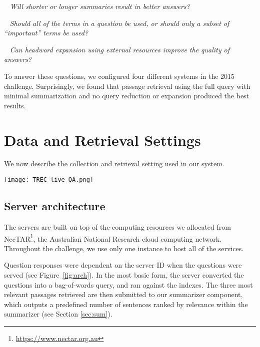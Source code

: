 \documentclass[a4paper,10pt,conference,compsocconf,final]{IEEEtran}
\newcommand{\myparagraph}[1]{\vspace*{1ex}\noindent{\textbf{#1.}}~}
\newcommand{\ko}[1]{\textrm{\textcolor{red}{Kevin says: #1\\}}}
\begin{document}
\myparagraph{RQ 1:}
{\emph{
Will shorter or longer summaries result in better answers?
}}

\myparagraph{RQ 2:}
{\emph{
Should all of the terms in a question be used, or should only a 
subset of ``important'' terms be used?
}}

\myparagraph{RQ 3:}
{\emph{
Can headword expansion using external resources improve the
quality of answers?
}}

\bigskip

To answer these questions, we configured four different systems 
in the 2015 challenge.
Surprisingly, we found that passage retrieval using the full query
with minimal summarization and no query reduction or expansion
produced the best results.

\section{Data and Retrieval Settings}
We now describe the collection and retrieval setting used in our
system. 

\begin{figure*}
  \centering
  \texttt{[image: TREC-live-QA.png]}
  \label{fig:arch}
  \caption{System architecture for each RMIT system.
  Green shading indicates components that are different when compared
  to RMIT0.}
  \end{figure*}

\subsection{Server architecture}

The servers are built on top of the computing resources we allocated
from NecTAR\footnote{\url{https://www.nectar.org.au}}, the Australian
National Research cloud computing network.
Throughout the challenge, we use only one instance to host all of the
services.

Question responses were dependent on the server ID when the questions
were served (see Figure~\ref{fig:arch}).
In the most basic form, the server converted the questions into a bag-of-words
query, and ran against the indexes.
The three most relevant passages retrieved are then submitted to our 
summarizer component, which outputs a predefined number of sentences ranked by
relevance within the summarizer (see Section \ref{sec:sum}).
\end{document}

